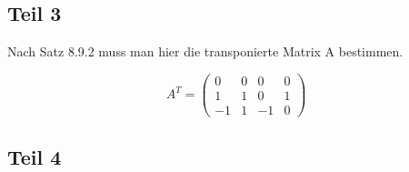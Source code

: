 \documentclass[a4paper,10pt]{article}
\begin{document}
\subsection*{Teil 3}

Nach Satz 8.9.2 muss man hier die transponierte Matrix A bestimmen.

\begin{equation}
 A^T = 
  \begin{pmatrix}
   0 & 0 & 0 & 0\\
   1 & 1 & 0 & 1\\
   -1 & 1 & -1 & 0
  \end{pmatrix}
\end{equation}

\subsection*{Teil 4}
\end{document}
